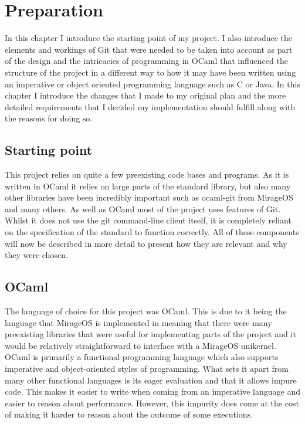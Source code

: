 \chapter{Preparation}

 In this chapter I introduce the starting point of my project. I also introduce the elements and workings of Git that were needed to be taken into account as part of the design and the intricacies of programming in OCaml that influenced the structure of the project in a different way to how it may have been written using an imperative or object oriented programming language such as C or Java. In this chapter I introduce the changes that I made to my original plan and the more detailed requirements that I decided my implementation should fulfill along with the reasons for doing so.

\section{Starting point}

This project relies on quite a few preexisting code bases and programs. As it is written in OCaml it relies on large parts of the standard library, but also many other libraries have been incredibly important such as ocaml-git from MirageOS and many others. As well as OCaml most of the project uses features of Git. Whilst it does not use the git command-line client itself, it is completely reliant on the specification of the standard to function correctly. All of these components will now be described in more detail to present how they are relevant and why they were chosen.

\section{OCaml}

The language of choice for this project was OCaml\cite{code_ocaml}. This is due to it being the language that MirageOS is implemented in meaning that there were many preexisting libraries that were useful for implementing parts of the project and it would be relatively straightforward to interface with a MirageOS unikernel. OCaml is primarily a functional programming language which also supports imperative and object-oriented styles of programming. What sets it apart from many other functional languages is its eager evaluation and that it allows impure code. This makes it easier to write when coming from an imperative language and easier to reason about performance. However, this impurity does come at the cost of making it harder to reason about the outcome of some executions.

